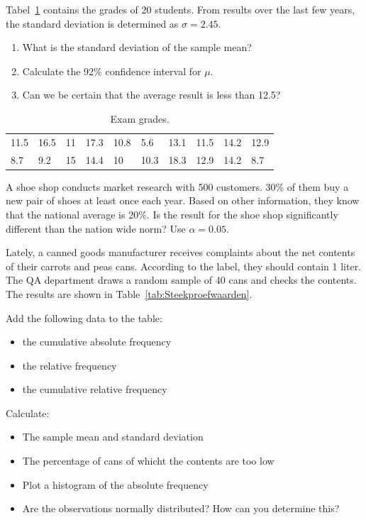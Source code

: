 \begin{exercise}
  Tabel~\ref{tab:examen} contains the grades of 20 students. From results over the last few years, the standard deviation is determined as $\sigma = 2.45$.
  
  \begin{enumerate}[label=\alph*.]
    \item What is the standard deviation of the sample mean?
    \item Calculate the 92\% confidence interval for $\mu$.
    \item Can we be certain that the average result is less than 12.5?
  \end{enumerate}
\end{exercise}

\begin{table}
  \centering
  \begin{tabular}{llllllllll}
    11.5 & 16.5 & 11 & 17.3 & 10.8 & 5.6  & 13.1 & 11.5 & 14.2 & 12.9 \\
    8.7  & 9.2  & 15 & 14.4 & 10   & 10.3 & 18.3 & 12.9 & 14.2 & 8.7 
  \end{tabular}
  \caption{Exam grades.}
  \label{tab:examen}
\end{table}

\begin{exercise}
  A shoe shop conducts market research with 500 customers. 30\% of them buy a new pair of shoes at least once each year. Based on other information, they know that the national average is 20\%. Is the result for the shoe shop significantly different than the nation wide norm? Use $\alpha = 0.05$.
\end{exercise}

\begin{exercise}
  Lately, a canned goods manufacturer receives complaints about the net contents of their carrots and peas cans. According to the label, they should contain 1 liter. The QA department draws a random sample of 40 cans and checks the contents. The results are shown in Table~\ref{tab:Steekproefwaarden}.
  
  Add the following data to the table:
  \begin{itemize}
    \item the cumulative absolute frequency
    \item the relative frequency
    \item the cumulative relative frequency
  \end{itemize}

  Calculate:
  
  \begin{itemize}
    \item The sample mean and standard deviation
    \item The percentage of cans of whicht the contents are too low
    \item Plot a histogram of the absolute frequency
    \item Are the observations normally distributed? How can you determine this?
  \end{itemize}
  
\end{exercise}

